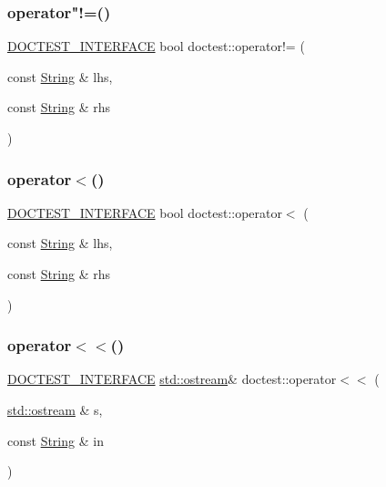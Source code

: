 \mbox{\label{namespacedoctest_ab9a88e4c19857cd86a0f037d27bcad72}} 
\subsubsection{\texorpdfstring{operator"!=()}{operator!=()}}
{\footnotesize\ttfamily \hyperlink{doctest_8h_a9c16ffc635ec47f07797d21ede26b1a5}{D\+O\+C\+T\+E\+S\+T\+\_\+\+I\+N\+T\+E\+R\+F\+A\+CE} bool doctest\+::operator!= (\begin{DoxyParamCaption}\item[{const \hyperlink{classdoctest_1_1_string}{String} \&}]{lhs,  }\item[{const \hyperlink{classdoctest_1_1_string}{String} \&}]{rhs }\end{DoxyParamCaption})}

\mbox{\label{namespacedoctest_afa15b277b9a277793b7adf129e0128d9}} 
\subsubsection{\texorpdfstring{operator$<$()}{operator<()}}
{\footnotesize\ttfamily \hyperlink{doctest_8h_a9c16ffc635ec47f07797d21ede26b1a5}{D\+O\+C\+T\+E\+S\+T\+\_\+\+I\+N\+T\+E\+R\+F\+A\+CE} bool doctest\+::operator$<$ (\begin{DoxyParamCaption}\item[{const \hyperlink{classdoctest_1_1_string}{String} \&}]{lhs,  }\item[{const \hyperlink{classdoctest_1_1_string}{String} \&}]{rhs }\end{DoxyParamCaption})}

\mbox{\label{namespacedoctest_a44abf00f713df05b4185eda7403268b7}} 
\subsubsection{\texorpdfstring{operator$<$$<$()}{operator<<()}}
{\footnotesize\ttfamily \hyperlink{doctest_8h_a9c16ffc635ec47f07797d21ede26b1a5}{D\+O\+C\+T\+E\+S\+T\+\_\+\+I\+N\+T\+E\+R\+F\+A\+CE} \hyperlink{doctest_8h_a116af65cb5e924b33ad9d9ecd7a783f3}{std\+::ostream}\& doctest\+::operator$<$$<$ (\begin{DoxyParamCaption}\item[{\hyperlink{doctest_8h_a116af65cb5e924b33ad9d9ecd7a783f3}{std\+::ostream} \&}]{s,  }\item[{const \hyperlink{classdoctest_1_1_string}{String} \&}]{in }\end{DoxyParamCaption})}

